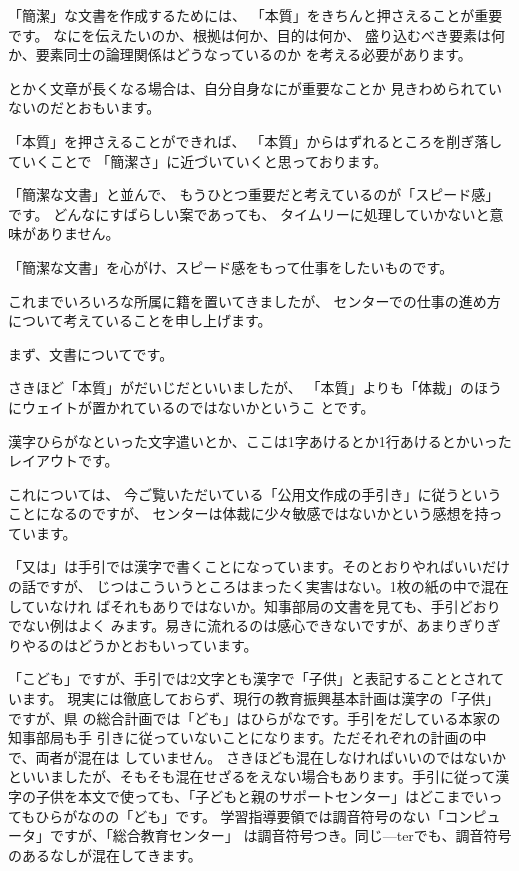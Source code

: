\documentclass[uplatex,jis2004,dvipdfmx,12pt]{jsarticle}
\begin{document}
「簡潔」な文書を作成するためには、
「本質」をきちんと押さえることが重要です。
なにを伝えたいのか、根拠は何か、目的は何か、
盛り込むべき要素は何か、要素同士の論理関係はどうなっているのか
を考える必要があります。

とかく文章が長くなる場合は、自分自身なにが重要なことか
見きわめられていないのだとおもいます。

「本質」を押さえることができれば、
「本質」からはずれるところを削ぎ落していくことで
「簡潔さ」に近づいていくと思っております。

「簡潔な文書」と並んで、
もうひとつ重要だと考えているのが「スピード感」です。
どんなにすばらしい案であっても、
タイムリーに処理していかないと意味がありません。

「簡潔な文書」を心がけ、スピード感をもって仕事をしたいものです。

これまでいろいろな所属に籍を置いてきましたが、
センターでの仕事の進め方について考えていることを申し上げます。

まず、文書についてです。

さきほど「本質」がだいじだといいましたが、
「本質」よりも「体裁」のほうにウェイトが置かれているのではないかというこ
とです。


漢字ひらがなといった文字遣いとか、ここは1字あけるとか1行あけるとかいったレイアウトです。

これについては、
今ご覧いただいている「公用文作成の手引き」に従うということになるのですが、
センターは体裁に少々敏感ではないかという感想を持っています。

「又は」は手引では漢字で書くことになっています。そのとおりやればいいだけの話ですが、
じつはこういうところはまったく実害はない。1枚の紙の中で混在していなけれ
ばそれもありではないか。知事部局の文書を見ても、手引どおりでない例はよく
みます。易きに流れるのは感心できないですが、あまりぎりぎりやるのはどうかとおもいっています。


「こども」ですが、手引では2文字とも漢字で「子供」と表記することとされています。
現実には徹底しておらず、現行の教育振興基本計画は漢字の「子供」ですが、県
の総合計画では「ども」はひらがなです。手引をだしている本家の知事部局も手
引きに従っていないことになります。ただそれぞれの計画の中で、両者が混在は
していません。
さきほども混在しなければいいのではないかといいましたが、そもそも混在せざるをえない場合もあります。手引に従って漢字の子供を本文で使っても、「子どもと親のサポートセンター」はどこまでいってもひらがなのの「ども」です。
学習指導要領では調音符号のない「コンピュータ」ですが、「総合教育センター」
は調音符号つき。同じ---terでも、調音符号のあるなしが混在してきます。
\end{document}
